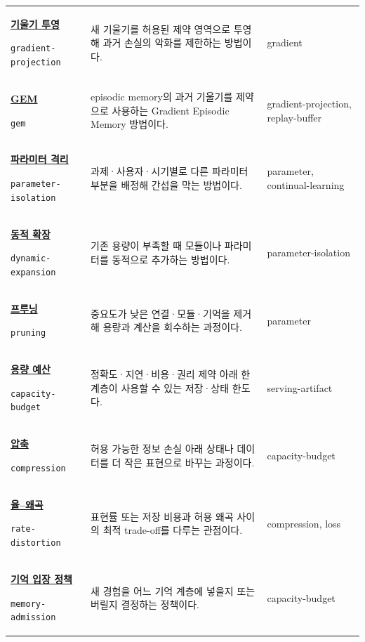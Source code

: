 \begin{longtable}{p{} p{} p{}}
\hypertarget{glossary:gradient-projection}{\hyperref[bg:gradient-projection]{\textbf{기울기 투영}}} \newline\texttt{gradient-projection} & 새 기울기를 허용된 제약 영역으로 투영해 과거 손실의 악화를 제한하는 방법이다. & \scriptsize gradient \\
\hypertarget{glossary:gem}{\hyperref[bg:gem]{\textbf{GEM}}} \newline\texttt{gem} & episodic memory의 과거 기울기를 제약으로 사용하는 Gradient Episodic Memory 방법이다. & \scriptsize gradient-projection, replay-buffer \\
\hypertarget{glossary:parameter-isolation}{\hyperref[bg:parameter-isolation]{\textbf{파라미터 격리}}} \newline\texttt{parameter-isolation} & 과제·사용자·시기별로 다른 파라미터 부분을 배정해 간섭을 막는 방법이다. & \scriptsize parameter, continual-learning \\
\hypertarget{glossary:dynamic-expansion}{\hyperref[bg:dynamic-expansion]{\textbf{동적 확장}}} \newline\texttt{dynamic-expansion} & 기존 용량이 부족할 때 모듈이나 파라미터를 동적으로 추가하는 방법이다. & \scriptsize parameter-isolation \\
\hypertarget{glossary:pruning}{\hyperref[bg:pruning]{\textbf{프루닝}}} \newline\texttt{pruning} & 중요도가 낮은 연결·모듈·기억을 제거해 용량과 계산을 회수하는 과정이다. & \scriptsize parameter \\
\hypertarget{glossary:capacity-budget}{\hyperref[bg:capacity-budget]{\textbf{용량 예산}}} \newline\texttt{capacity-budget} & 정확도·지연·비용·권리 제약 아래 한 계층이 사용할 수 있는 저장·상태 한도다. & \scriptsize serving-artifact \\
\hypertarget{glossary:compression}{\hyperref[bg:compression]{\textbf{압축}}} \newline\texttt{compression} & 허용 가능한 정보 손실 아래 상태나 데이터를 더 작은 표현으로 바꾸는 과정이다. & \scriptsize capacity-budget \\
\hypertarget{glossary:rate-distortion}{\hyperref[bg:rate-distortion]{\textbf{율–왜곡}}} \newline\texttt{rate-distortion} & 표현률 또는 저장 비용과 허용 왜곡 사이의 최적 trade-off를 다루는 관점이다. & \scriptsize compression, loss \\
\hypertarget{glossary:memory-admission}{\hyperref[bg:memory-admission]{\textbf{기억 입장 정책}}} \newline\texttt{memory-admission} & 새 경험을 어느 기억 계층에 넣을지 또는 버릴지 결정하는 정책이다. & \scriptsize capacity-budget \\

\end{longtable}
